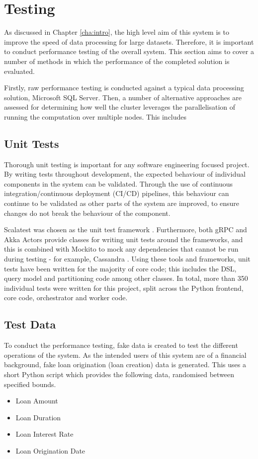 \chapter{Testing}\label{cha:testing}


As discussed in Chapter \ref{cha:intro}, the high level aim of this system is to improve the speed of data processing for large datasets. Therefore, it is important to conduct performance testing of the overall system. This section aims to cover a number of methods in which the performance of the completed solution is evaluated.

Firstly, raw performance testing is conducted against a typical data processing solution, Microsoft SQL Server. Then, a number of alternative approaches are assessed for determining how well the cluster leverages the parallelisation of running the computation over multiple nodes. This includes

\section{Unit Tests}
Thorough unit testing is important for any software engineering focused project. By writing tests throughout development, the expected behaviour of individual components in the system can be validated. Through the use of continuous integration/continuous deployment (CI/CD) pipelines, this behaviour can continue to be validated as other parts of the system are improved, to ensure changes do not break the behaviour of the component. 

Scalatest was chosen as the unit test framework . Furthermore, both gRPC and Akka Actors provide classes for writing unit tests around the frameworks, and this is combined with Mockito to mock any dependencies that cannot be run during testing - for example, Cassandra . Using these tools and frameworks, unit tests have been written for the majority of core code; this includes the DSL, query model and partitioning code among other classes. In total, more than 350 individual tests were written for this project, split across the Python frontend, core code, orchestrator and worker code.

\section{Test Data}
To conduct the performance testing, fake data is created to test the different operations of the system. As the intended users of this system are of a financial background, fake loan origination (loan creation) data is generated. This uses a short Python script which provides the following data, randomised between specified bounds.
\begin{itemize}
	\item Loan Amount
	\item Loan Duration
	\item Loan Interest Rate
	\item Loan Origination Date
\end{itemize}

